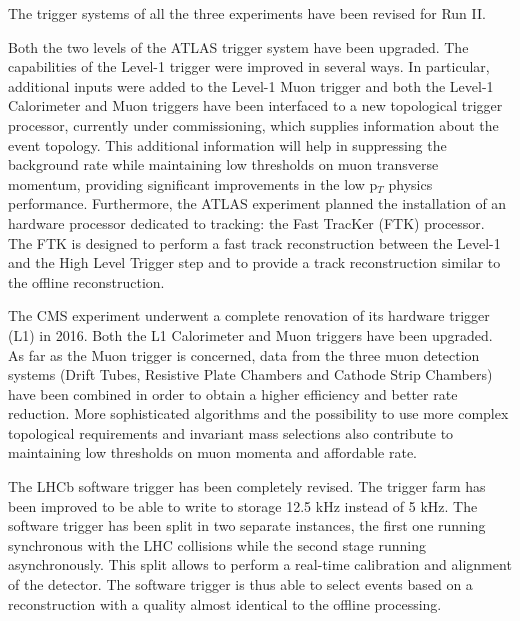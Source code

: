 The trigger systems of all the three experiments have been revised for Run II.

Both the two levels of the ATLAS trigger system have been upgraded.
The capabilities of the Level-1 trigger were improved in several ways.
In particular, additional inputs were added to the Level-1 Muon trigger and both the Level-1 Calorimeter and Muon triggers have been interfaced to a new topological trigger processor, currently under commissioning, which supplies information about the event topology. 
This additional information will help in suppressing the background rate while maintaining low thresholds on muon transverse momentum, providing significant improvements in the low p$_T$ physics performance.
Furthermore, the ATLAS experiment planned the installation of an hardware processor dedicated to tracking: the Fast TracKer (FTK) processor. 
The FTK is designed to perform a fast track reconstruction between the Level-1 and the High Level Trigger step and to provide a track reconstruction similar to the offline reconstruction.

The CMS experiment underwent a complete renovation of its hardware trigger (L1) in 2016.
Both the L1 Calorimeter and Muon triggers have been upgraded.
As far as the Muon trigger is concerned, data from the three muon detection systems (Drift Tubes, Resistive Plate Chambers and Cathode Strip Chambers) have been combined in order to obtain a higher efficiency and better rate reduction. 
More sophisticated algorithms and the possibility to use more complex topological requirements and invariant mass selections also contribute to maintaining low thresholds on muon momenta and affordable rate.

The LHCb software trigger has been completely revised. 
The trigger farm has been improved to be able to write to storage 12.5 kHz instead of 5 kHz.
The software trigger has been split in two separate instances, the first one running synchronous with the LHC collisions while the second stage running asynchronously. 
This split allows to perform a real-time calibration and alignment of the detector. 
The software trigger is thus able to select events based on a reconstruction with a quality almost identical to the offline processing.



